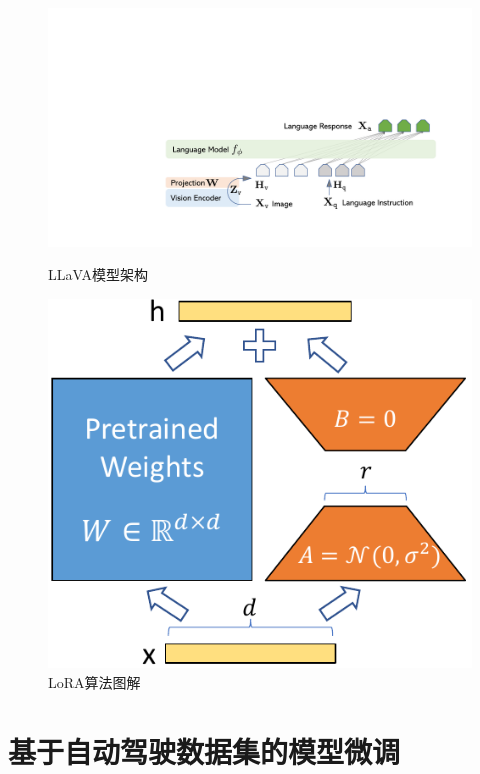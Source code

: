 \documentclass[
    linespread = 1.25
]{ctexart}
\begin{document}
\begin{figure}[htbp]
  \centering
  \begin{minipage}[b]{0.6\textwidth}
    \includegraphics[width=\textwidth]{illu_llava.pdf}
    \caption{LLaVA模型架构}
    \label{fig:LLaVA}
  \end{minipage}
  \hfill
  \begin{minipage}[b]{0.25\textwidth}
    \includegraphics[width=\textwidth]{illu_lora.pdf}
    \caption{LoRA算法图解}
    \label{fig:LoRA}
  \end{minipage}
\end{figure}


\section{基于自动驾驶数据集的模型微调}
\end{document}
